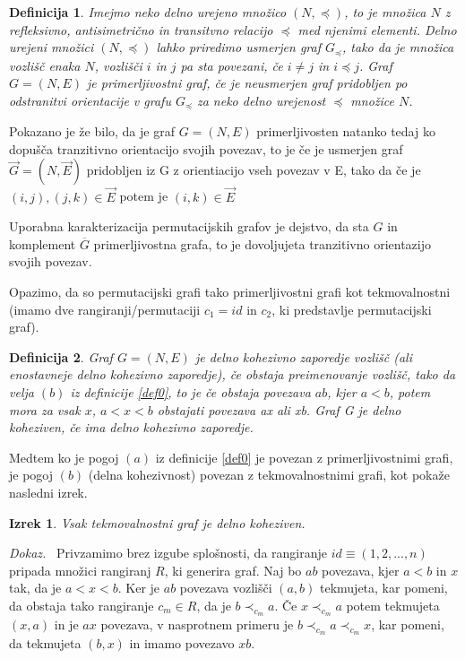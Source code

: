 \documentclass[a4paper, 12pt]{book}
\newtheorem{definicija}{Definicija}[chapter]
\newtheorem{izrek}{Izrek}[chapter]
\newenvironment{dokaz}{\emph{Dokaz.}\ }{\hspace{\fill}{$\Box$}}
\begin{document}
\begin{definicija}
    Imejmo neko delno urejeno množico $(N, \preceq)$, to je množica $N$ z refleksivno, antisimetrično in transitvno relacijo $\preceq$ med njenimi elementi. Delno urejeni množici $(N, \preceq)$ lahko priredimo usmerjen graf $G_{\preceq}$, tako da je množica vozlišč enaka $N$, vozlišči $i$ in $j$ pa sta povezani, če $i \neq j$ in $i \preceq j$.
    Graf $G = (N, E)$ je primerljivostni graf, če je neusmerjen graf pridobljen po odstranitvi orientacije v grafu $G_{\preceq}$ za neko delno urejenost $\preceq$  množice $N$.
\end{definicija}

Pokazano je že bilo, da je graf $G = (N, E)$ primerljivosten natanko tedaj ko dopušča tranzitivno orientacijo svojih povezav, to je če je usmerjen graf $\overset{\rightarrow}{G} = (N, \overset{\rightarrow}{E})$ pridobljen iz G z orientiacijo vseh povezav v E, tako da če je $(i, j), (j, k) \in \overset{\rightarrow}{E}$ potem je $(i, k) \in \overset{\rightarrow}{E}$

Uporabna karakterizacija permutacijskih grafov je dejstvo, da sta $G$ in komplement $\overline{G}$ primerljivostna grafa, to je dovoljujeta tranzitivno orientazijo svojih povezav. 

Opazimo, da so permutacijski grafi tako primerljivostni grafi kot tekmovalnostni (imamo dve rangiranji/permutaciji $c_1 = id$ in $c_2$, ki predstavlje permutacijski graf).

\begin{definicija}
    Graf $G = (N, E)$ je delno kohezivno zaporedje vozlišč (ali enostavneje delno kohezivno zaporedje), če obstaja preimenovanje vozlišč, tako da velja $(b)$ iz definicije \ref{def0}, to je če obstaja povezava $ab$, kjer $a < b$, potem mora za vsak $x$, $a < x < b$ obstajati povezava ax ali xb. Graf G je delno koheziven, če ima delno kohezivno zaporedje.
\end{definicija}

Medtem ko je pogoj $(a)$ iz definicije \ref{def0} je povezan z primerljivostnimi grafi, je pogoj $(b)$ (delna kohezivnost) povezan z tekmovalnostnimi grafi, kot pokaže nasledni izrek.

\begin{izrek}
\label{tekmovalnosni_graf_delno_koheziven}
    Vsak tekmovalnostni graf je delno koheziven.
\end{izrek}
\begin{dokaz}
    Privzamimo brez izgube splošnosti, da rangiranje $id \equiv (1, 2, ..., n)$ pripada množici rangiranj $R$, ki generira graf. Naj bo $ab$ povezava, kjer $a < b$ in $x$ tak, da je $a < x < b$. Ker je $ab$ povezava vozlišči $(a, b)$ tekmujeta, kar pomeni, da obstaja tako rangiranje $c_m \in R$, da je $b \prec_{c_m} a$. Če $x \prec_{c_m} a$ potem tekmujeta $(x, a)$ in je $ax$ povezava, v nasprotnem primeru je $b \prec_{c_m} a \prec_{c_m} x$, kar pomeni, da tekmujeta $(b, x)$ in imamo povezavo $xb$.
\end{dokaz}
\end{document}
